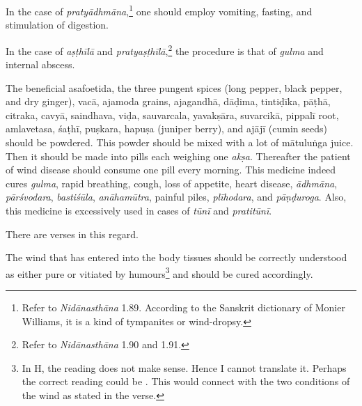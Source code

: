\begin{translation}
\begin{tt}
        In the case of
        \textit{pratyādhmāna},\footnote{Refer to \textit{Nidānasthāna} 1.89.
            According to the Sanskrit dictionary of Monier Williams, it is a kind of tympanites
            or wind-dropsy.} one should employ vomiting, fasting, and stimulation of
        digestion.



        \item[27]

        In the case of
        \textit{aṣṭhīlā} and \textit{pratyaṣṭhīlā},\footnote{Refer to
            \textit{Nidānasthāna} 1.90 and 1.91.} the procedure is that of \textit{gulma}
        and internal abscess.



        \item[28]

        The beneficial
        asafoetida, the three pungent spices (long pepper, black pepper, and dry
        ginger), \gls{vacā}, \gls{ajamoda} grains, \gls{ajagandhā}, \gls{dāḍima},
        \gls{tintiḍīka}, \gls{pāṭhā}, \gls{citraka}, \gls{cavyā}, \gls{saindhava},
        \gls{viḍa}, \gls{sauvarcala}, \gls{yavakṣāra}, \gls{suvarcikā}, \gls{pippalī}
        root, \gls{amlavetasa}, \gls{śaṭhī}, \gls{puṣkara}, \gls{hapuṣa} (juniper berry),
        and \gls{ajājī} (cumin seeds) should be powdered. This powder should be mixed
        with a lot of \gls{mātuluṅga} juice. Then it should be made into pills each
        weighing one \textit{akṣa}. Thereafter the patient of wind disease should
        consume one pill every morning. This medicine indeed cures \textit{gulma},
        rapid breathing, cough, loss of appetite, heart disease, \textit{ādhmāna},
        \textit{pārśvodara}, \textit{bastiśūla}, \textit{anāhamūtra}, painful piles,
        \textit{plīhodara}, and \textit{pāṇḍuroga}. Also, this medicine is excessively
        used in cases of \textit{tūnī} and \textit{pratitūnī}.



        \item[29]

        There are
        verses in this regard.


        \begin{sloka}

            The wind
            that has entered into the body tissues should be correctly understood as either
            pure or vitiated by humours\footnote{In H, the reading 
                does not make sense. Hence I cannot translate it. Perhaps the correct reading
                could be . This would connect with the two conditions of
                the wind as stated in the verse.} and should be cured accordingly.



\end{sloka}
\end{tt}
\end{translation}
